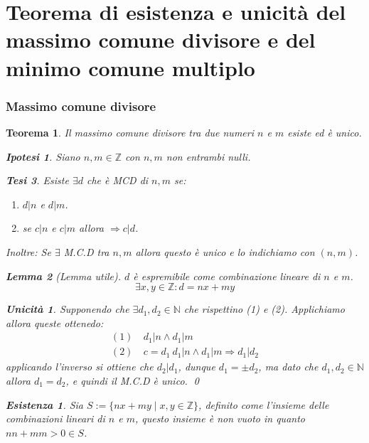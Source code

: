 \documentclass{article}
\makeatletter
\renewenvironment{proof}[1][\proofname]{\par
    \pushQED{\qed}%
    \normalfont \topsep6\p@\@plus6\p@\relax
    \trivlist
    \item\relax
    {\itshape
    #1\@addpunct{.}}\hspace\labelsep\ignorespaces
    }{%
    \popQED\endtrivlist\@endpefalse
}
\newtheorem{theorem}{Teorema}[part]
\newtheorem{lemma}{Lemma}[theorem]
\newtheorem{ipothesis}[lemma]{Ipotesi}
\newtheorem{thesis}[lemma]{Tesi}
\theoremstyle{definition}
\newtheorem*{existence}{Esistenza}
\newtheorem*{uniqueness}{Unicità}
\makeatother
\begin{document}
\part{Teorema di esistenza e unicità del massimo comune divisore e del minimo comune multiplo}
\section{Massimo comune divisore}
\begin{theorem}
    Il massimo comune divisore tra due numeri \(n\) e \(m\) esiste ed è unico.
    \begin{ipothesis}
        Siano \(n,m\in\mathbb{Z}\) con \(n,m\) non entrambi nulli.
    \end{ipothesis}
    \begin{thesis}
        Esiste \(\exists d\) che è MCD di \(n,m\) se:
        \begin{enumerate}
            \item \(d|n\) e \(d|m\).
            \item se \(c|n\) e \(c|m\) allora \(\Rightarrow c|d\).
        \end{enumerate} 
        Inoltre: Se \(\exists\) M.C.D tra \(n,m\) allora questo è unico e lo indichiamo con \((n,m)\).
        \begin{lemma}[Lemma utile]
            \(d\) è espremibile come combinazione lineare di \(n\) e \(m\).
            \[
                \exists x,y\in\mathbb{Z}: d=nx+my
            \]
        \end{lemma}
    \end{thesis}
    \begin{proof}
        \begin{uniqueness}
            Supponendo che \(\exists d_1,d_2\in\mathbb{N}\) che rispettino (1) e (2). Applichiamo allora queste ottenedo:
            \[
                \begin{aligned}
                    (1)&\ d_1|n \wedge d_1|m\\
                    (2)&\ c=d_1\ d_1|n \wedge d_1|m \Rightarrow d_1|d_2
                \end{aligned}
            \]
            applicando l'inverso si ottiene che \(d_2|d_1\), dunque \(d_1=\pm d_2\), ma dato che \(d_1,d_2\in\mathbb{N}\) allora \(d_1=d_2\), e quindi il M.C.D è unico.
            \qed
        \end{uniqueness}
        \begin{existence}
            Sia \(S:=\{nx+my\mid x,y\in\mathbb{Z}\}\), definito come l'insieme delle combinazioni lineari di \(n\) e \(m\), questo insieme è non vuoto in quanto \(nn+mm>0\in S\).

\end{existence}
\end{proof}
\end{theorem}
\end{document}

